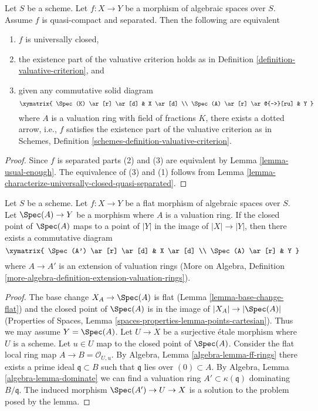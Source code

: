 \begin{lemma}
\label{lemma-characterize-universally-closed-separated}
Let $S$ be a scheme. Let $f : X \to Y$ be a morphism of algebraic spaces
over $S$. Assume $f$ is quasi-compact and separated. Then the following
are equivalent
\begin{enumerate}
\item $f$ is universally closed,
\item the existence part of the valuative criterion holds
as in Definition \ref{definition-valuative-criterion}, and
\item given any commutative solid diagram
$$
\xymatrix{
\Spec(K) \ar[r] \ar[d] & X \ar[d] \\
\Spec(A) \ar[r] \ar@{-->}[ru] & Y
}
$$
where $A$ is a valuation ring with field of fractions $K$, there exists
a dotted arrow, i.e., $f$ satisfies the existence part of the valuative
criterion as in
Schemes, Definition \ref{schemes-definition-valuative-criterion}.
\end{enumerate}
\end{lemma}

\begin{proof}
Since $f$ is separated parts (2) and (3) are equivalent by
Lemma \ref{lemma-usual-enough}.
The equivalence of (3) and (1) follows from
Lemma \ref{lemma-characterize-universally-closed-quasi-separated}.
\end{proof}

\begin{lemma}
\label{lemma-lift-valuation-ring-through-flat-morphism}
Let $S$ be a scheme. Let $f : X \to Y$ be a flat morphism
of algebraic spaces over $S$.
Let $\Spec(A) \to Y$ be a morphism where $A$ is a
valuation ring. If the closed point of $\Spec(A)$ maps to a
point of $|Y|$ in the image of $|X| \to |Y|$, then there exists
a commutative diagram
$$
\xymatrix{
\Spec(A') \ar[r] \ar[d] & X \ar[d] \\
\Spec(A) \ar[r] & Y
}
$$
where $A \to A'$ is an extension of valuation rings
(More on Algebra, Definition
\ref{more-algebra-definition-extension-valuation-rings}).
\end{lemma}

\begin{proof}
The base change $X_A \to \Spec(A)$ is flat
(Lemma \ref{lemma-base-change-flat}) and the closed point of
$\Spec(A)$ is in the image of $|X_A| \to |\Spec(A)|$
(Properties of Spaces, Lemma \ref{spaces-properties-lemma-points-cartesian}).
Thus we may assume $Y = \Spec(A)$. Let $U \to X$ be a surjective
\'etale morphism where $U$ is a scheme. Let $u \in U$ map to
the closed point of $\Spec(A)$. Consider the flat local ring map
$A \to B = \mathcal{O}_{U, u}$. By
Algebra, Lemma \ref{algebra-lemma-ff-rings}
there exists a prime ideal $\mathfrak q \subset B$ such that
$\mathfrak q$ lies over $(0) \subset A$. By
Algebra, Lemma \ref{algebra-lemma-dominate}
we can find a valuation ring $A' \subset \kappa(\mathfrak q)$
dominating $B/\mathfrak q$. The induced morphism
$\Spec(A') \to U \to X$ is a solution to the problem
posed by the lemma.
\end{proof}

